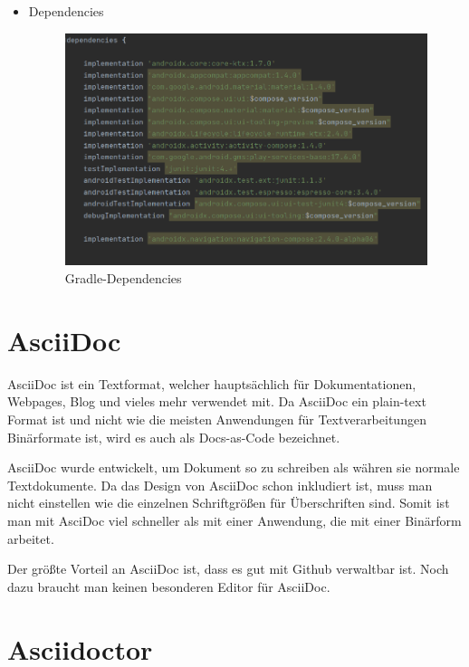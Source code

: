 \begin{itemize}
    \item Dependencies
    \begin{figure}[htp]
        \author{Bozidar Spasenovic}
        \centering
        \includegraphics[scale=0.40]{pics/gradle-dependencies.PNG}
        \caption{Gradle-Dependencies}
        \label{fig:impl:gradle-Dependencies}
    \end{figure}   
\end{itemize}





\pagebreak



\section{AsciiDoc}
\author{David Ignjatovic}

AsciiDoc ist ein Textformat, welcher hauptsächlich für Dokumentationen, Webpages, Blog und vieles mehr verwendet mit.
Da AsciiDoc ein plain-text Format ist und nicht wie die meisten Anwendungen für Textverarbeitungen Binärformate ist, wird es auch als Docs-as-Code bezeichnet.

AsciiDoc wurde entwickelt, um Dokument so zu schreiben als währen sie normale Textdokumente. Da das Design von AsciiDoc schon inkludiert ist,
muss man nicht einstellen wie die einzelnen Schriftgrößen für Überschriften sind. Somit ist man mit AsciDoc viel schneller als mit einer Anwendung,
die mit einer Binärform arbeitet.

Der größte Vorteil an AsciiDoc ist, dass es gut mit Github verwaltbar ist. Noch dazu braucht man keinen besonderen Editor für AsciiDoc. 

\section{Asciidoctor}
\author{David Ignjatovic}


